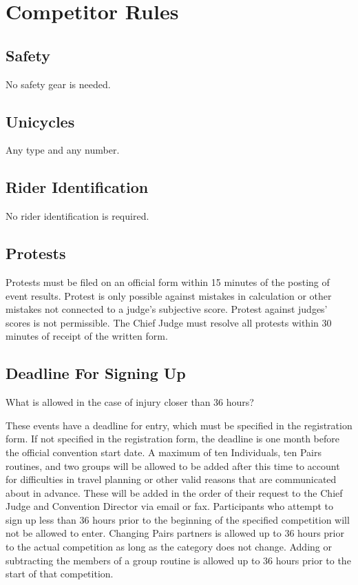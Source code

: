 \chapter{Competitor Rules}

\section{Safety}

No safety gear is needed.

\section{Unicycles}

Any type and any number.

\section{Rider Identification}

No rider identification is required.%

\section{Protests}


Protests must be filed on an official form within 15 minutes of the posting of event results.
Protest is only possible against mistakes in calculation or other mistakes not connected to a judge's subjective score.
Protest against judges' scores is not permissible.
The Chief Judge must resolve all protests within 30 minutes of receipt of the written form.

\section{Deadline For Signing Up}

\begin{comment2016}
What is allowed in the case of injury closer than 36 hours?
\end{comment2016}

These events have a deadline for entry, which must be specified in the registration form.
If not specified in the registration form, the deadline is one month before the official convention start date.
A maximum of ten Individuals, ten Pairs routines, and two groups will be allowed to be added after this time to account for difficulties in travel planning or other valid reasons that are communicated about in advance.
These will be added in the order of their request to the Chief Judge and Convention Director via email or fax.
Participants who attempt to sign up less than 36 hours prior to the beginning of the specified competition will not be allowed to enter.
Changing Pairs partners is allowed up to 36 hours prior to the actual competition as long as the category does not change.
Adding or subtracting the members of a group routine is allowed up to 36 hours prior to the start of that competition.


